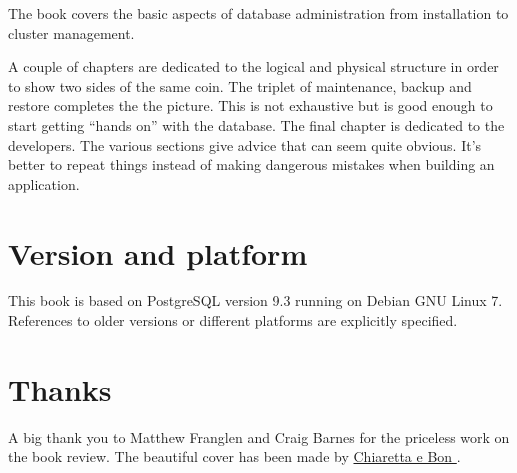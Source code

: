 \documentclass[oneside]{book}
\begin{document}
The book covers the basic aspects of database administration from installation
to cluster management.\newline

A couple of chapters are dedicated to the logical and physical structure in
order to show two sides of the same coin.  The triplet of maintenance, backup and restore completes the
the picture. This is not exhaustive but is good enough to start getting ``hands on'' with the database.
The final chapter is dedicated to the developers. The various sections
give advice that can seem quite obvious. It's better to repeat things instead of making dangerous
mistakes when building an application.

\chapter*{Version and platform}
This book is based on PostgreSQL version 9.3 running on Debian GNU Linux 7.
References to older versions or different platforms are explicitly specified.

\chapter*{Thanks}
A big thank you to Matthew Franglen and Craig Barnes for the priceless work on the book review.\newline
The beautiful cover has been made by \href{http://www.bonland.eu/}{
Chiaretta e Bon }.\newline

\tableofcontents{}













\appendix



\listoffigures
\listoftables
\printindex{}
\end{document}
